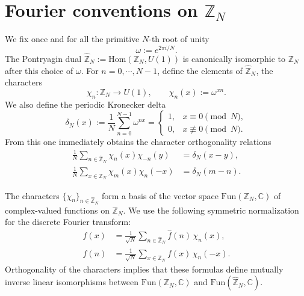 \documentclass[dvipsnames,a4paper]{article}
\numberwithin{equation}{section}
\theoremstyle{definition}
\theoremstyle{remark}
\newcommand{\Hom}{\mathrm{Hom}}
\begin{document}
\appendix




\section{Fourier conventions on \texorpdfstring{$\mathbb Z_N$}{Z_N}}
\label{app:fourier-ZN}

We fix once and for all the primitive \(N\)-th root of unity
\begin{equation}
	\omega := e^{2\pi i/N}.
\end{equation}
The Pontryagin dual \(\widehat{\mathbb Z}_N := \Hom(\mathbb Z_N, U(1))\) is canonically isomorphic to \(\mathbb Z_N\) after this choice of \(\omega\). For $n=0,\cdots,N-1$, define the elements of $\widehat{\mathbb Z}_N$, the characters
\begin{equation}
	\chi_n: \mathbb Z_N \to U(1), \qquad \chi_n(x) := \omega^{xn}. \label{eq:ZNcharacter}
\end{equation}
We also define the periodic Kronecker delta
\begin{equation}
	\delta_N(x) := \frac{1}{N}\sum_{n=0}^{N-1}\omega^{nx} =
	\begin{cases}
		1, & x\equiv 0 \pmod N,\\
		0, & x\not\equiv 0 \pmod N.
	\end{cases}
	\label{eq:deltaN}
\end{equation}
From this one immediately obtains the character orthogonality relations
\begin{align}
	\frac{1}{N}\sum_{n\in \widehat{\mathbb Z}_N}\chi_n(x)\chi_{-n}(y)
	&=
	\delta_N(x-y),
	\label{eq:character-orthogonality-x}
	\\
	\frac{1}{N}\sum_{x\in \mathbb Z_N}\chi_m(x)\chi_n(-x)
	&=
	\delta_N(m-n).
	\label{eq:character-orthogonality-n}
\end{align}


The characters \(\{\chi_n\}_{n\in \widehat{\mathbb Z}_N}\) form a basis of the vector space
\(\mathrm{Fun}(\mathbb Z_N,\mathbb C)\) of complex-valued functions on \(\mathbb Z_N\).
We use the following symmetric normalization for the discrete Fourier transform:
\begin{subequations}
	\begin{align}
		f(x)
		&=
		\frac{1}{\sqrt N}\sum_{n\in \widehat{\mathbb Z}_N}\hat f(n)\,\chi_n(x),
		\label{eq:FT}
		\\
		\hat f(n)
		&=
		\frac{1}{\sqrt N}\sum_{x\in \mathbb Z_N}f(x)\,\chi_n(-x).
		\label{eq:invFT}
	\end{align}
\end{subequations}
Orthogonality of the characters implies that these formulas define mutually inverse linear isomorphisms between $\mathrm{Fun}(\mathbb Z_N,\mathbb C)$ and $\mathrm{Fun}(\widehat{\mathbb Z}_N,\mathbb C)$.
\end{document}
